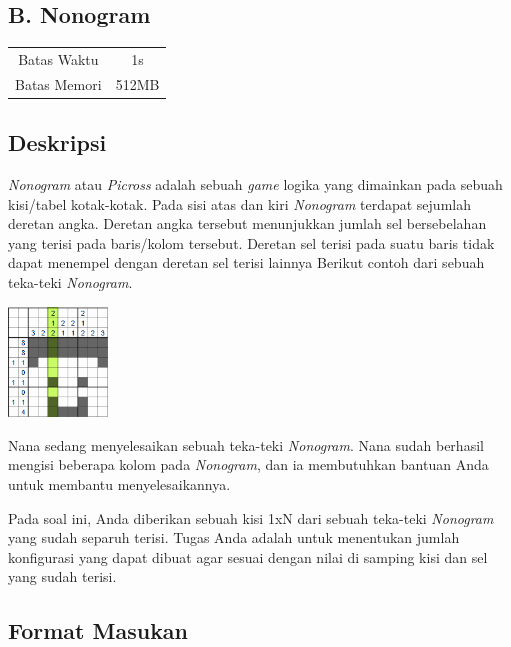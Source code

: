 \documentclass{article}
\begin{document}
\begin{center}
    \section*{B. Nonogram} %

    \begin{tabular}{ | c c | }
        \hline
        Batas Waktu  & 1s \\    %
        Batas Memori & 512MB \\  %
        \hline
    \end{tabular}
\end{center}

\subsection*{Deskripsi}

\textit{Nonogram} atau \textit{Picross} adalah sebuah \textit{game} logika yang dimainkan pada sebuah kisi/tabel kotak-kotak.
Pada sisi atas dan kiri \textit{Nonogram} terdapat sejumlah deretan angka.
Deretan angka tersebut menunjukkan jumlah sel bersebelahan yang terisi pada baris/kolom tersebut.
Deretan sel terisi pada suatu baris tidak dapat menempel dengan deretan sel terisi lainnya
Berikut contoh dari sebuah teka-teki \textit{Nonogram}.

\includegraphics[width=100px]{Homogram-Steve}

Nana sedang menyelesaikan sebuah teka-teki \textit{Nonogram}. 
Nana sudah berhasil mengisi beberapa kolom pada \textit{Nonogram}, dan ia membutuhkan bantuan Anda untuk membantu menyelesaikannya.

Pada soal ini, Anda diberikan sebuah kisi 1xN dari sebuah teka-teki \textit{Nonogram} yang sudah separuh terisi.
Tugas Anda adalah untuk menentukan jumlah konfigurasi yang dapat dibuat agar sesuai dengan nilai di samping kisi dan sel yang sudah terisi.

\subsection*{Format Masukan}
\end{document}
